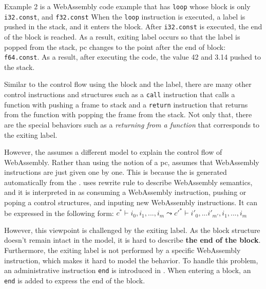 Example 2 is a WebAssembly code example that has \texttt{loop} whose block is
only \texttt{i32.const}, and \texttt{f32.const}
When the \texttt{loop} instruction is executed, a label is pushed in the stack,
and it enters the block.
After \texttt{i32.const} is executed, the end of the block is reached.
As a result, exiting label occurs so that the label is popped from the stack,
pc changes to the point after the end of block: \texttt{f64.const}.
As a result, after executing the code, the value 42 and 3.14 pushed to the
stack.


Similar to the control flow using the block and the label, there are many other
control instructions and structures such as a \texttt{call} instruction that
calls a function with pushing a frame to stack and a \texttt{return}
instruction that returns from the function with popping the frame from the
stack.
Not only that, there are the special behaviors such as a \textit{returning from
a function} that corresponds to the exiting label.


However, the \spectecp{} assumes a different model to explain the control flow
of WebAssembly.
Rather than using the notion of a pc, \spectecp{} assumes that WebAssembly
instructions are just given one by one.
This is because the \spectecp{} is generated automatically from the
.
 uses rewrite rule to describe WebAssembly semantics, and it
is interpreted in \spectecp{} as consuming a WebAssembly instruction, pushing
or poping a control structures, and inputing new WebAssembly instructions.
It can be expressed in the following form:
$c^* \vdash i_0, i_1, ..., i_m \leadsto c'^* \vdash i'_0, ...i'_{m'}, i_1, ..., i_m$


However, this viewpoint is challenged by the exiting label.
As the block structure doesn't remain intact in the model, it is hard to
describe \textbf{the end of the block}.
Furthermore, the exiting label is not performed by a specific WebAssembly
instruction, which makes it hard to model the behavior.
To handle this problem, an administrative instruction \texttt{end} is
introduced in \spectecp.
When entering a block, an \texttt{end} is added to express the end of the block.


